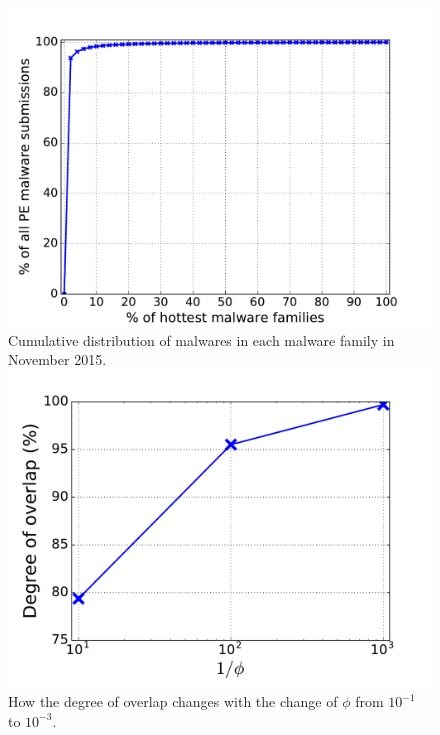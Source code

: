 
\begin{figure}[!htb]
  \includegraphics[width=\linewidth]{figure/cum}
{
Cumulative distribution of malwares in each malware family in November 2015.
}
\endminipage\hfill
{}
  \includegraphics[width=\linewidth]{figure/overlap.pdf}
  {
  How the degree of overlap changes with the change of $\phi$ from $10^{-1}$ to $10^{-3}$.
  }
\endminipage\hfill
{}

\end{figure}
